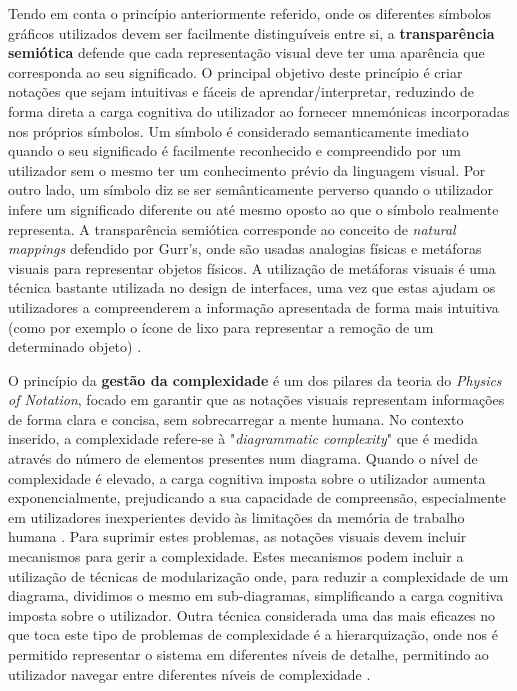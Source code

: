 Tendo em conta o princípio anteriormente referido, onde os diferentes símbolos gráficos utilizados devem ser facilmente distinguíveis entre si, a \textbf{transparência semiótica} defende que cada representação visual deve ter uma aparência que corresponda ao seu significado. O principal objetivo deste princípio é criar notações que sejam intuitivas e fáceis de aprendar/interpretar, reduzindo de forma direta a carga cognitiva do utilizador ao fornecer mnemónicas incorporadas nos próprios símbolos. Um símbolo é considerado semanticamente imediato quando o seu significado é facilmente reconhecido e compreendido por um utilizador sem o mesmo ter um conhecimento prévio da linguagem visual. Por outro lado, um símbolo diz se ser semânticamente perverso quando o utilizador infere um significado diferente ou até mesmo oposto ao que o símbolo realmente representa. A transparência semiótica corresponde ao conceito de \textit{natural mappings} defendido por Gurr's, onde são usadas analogias físicas e metáforas visuais para representar objetos físicos. A utilização de metáforas visuais é uma técnica bastante utilizada no design de interfaces, uma vez que estas ajudam os utilizadores a compreenderem a informação apresentada de forma mais intuitiva (como por exemplo o ícone de lixo para representar a remoção de um determinado objeto) \cite{moody2009physics}.

O princípio da \textbf{gestão da complexidade} é um dos pilares da teoria do \textit{Physics of Notation}, focado em garantir que as notações visuais representam informações de forma clara e concisa, sem sobrecarregar a mente humana. No contexto inserido, a complexidade refere-se à "\textit{diagrammatic complexity}" que é medida através do número de elementos presentes num diagrama. Quando o nível de complexidade é elevado, a carga cognitiva imposta sobre o utilizador aumenta exponencialmente, prejudicando a sua capacidade de compreensão, especialmente em utilizadores inexperientes devido às limitações da memória de trabalho humana \cite{sweller1988cognitive}. Para suprimir estes problemas, as notações visuais devem incluir mecanismos para gerir a complexidade. Estes mecanismos podem incluir a utilização de técnicas de modularização onde, para reduzir a complexidade de um diagrama, dividimos o mesmo em sub-diagramas, simplificando a carga cognitiva imposta sobre o utilizador. Outra técnica considerada uma das mais eficazes no que toca este tipo de problemas de complexidade é a hierarquização, onde nos é permitido representar o sistema em diferentes níveis de detalhe, permitindo ao utilizador navegar entre diferentes níveis de complexidade \cite{moody2009physics}. 

